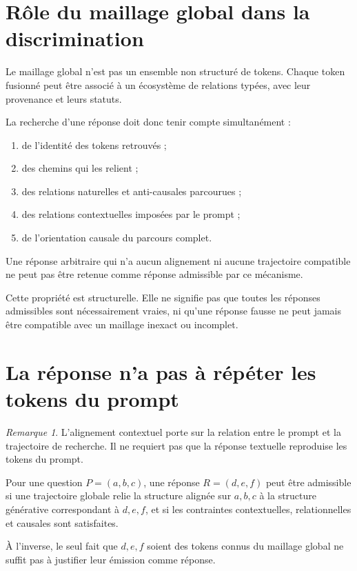 \documentclass[11pt,a4paper,oneside]{book}
\theoremstyle{remark}
\newtheorem{remarque}[definition]{Remarque}
\begin{document}
\section{Rôle du maillage global dans la discrimination}

Le maillage global n'est pas un ensemble non structuré de tokens.
Chaque token fusionné peut être associé à un écosystème de relations
typées, avec leur provenance et leurs statuts.

La recherche d'une réponse doit donc tenir compte simultanément :

\begin{enumerate}
  \item de l'identité des tokens retrouvés ;
  \item des chemins qui les relient ;
  \item des relations naturelles et anti-causales parcourues ;
  \item des relations contextuelles imposées par le prompt ;
  \item de l'orientation causale du parcours complet.
\end{enumerate}

Une réponse arbitraire qui n'a aucun alignement ni aucune trajectoire
compatible ne peut pas être retenue comme réponse admissible par
ce mécanisme.

Cette propriété est structurelle. Elle ne signifie pas que toutes
les réponses admissibles sont nécessairement vraies, ni qu'une
réponse fausse ne peut jamais être compatible avec un maillage
inexact ou incomplet.

\section{La réponse n'a pas à répéter les tokens du prompt}

\begin{remarque}
L'alignement contextuel porte sur la relation entre le prompt et la
trajectoire de recherche. Il ne requiert pas que la réponse textuelle
reproduise les tokens du prompt.

Pour une question \(P=(a,b,c)\), une réponse \(R=(d,e,f)\) peut être
admissible si une trajectoire globale relie la structure alignée sur
\(a,b,c\) à la structure générative correspondant à \(d,e,f\), et si
les contraintes contextuelles, relationnelles et causales sont
satisfaites.

À l'inverse, le seul fait que \(d,e,f\) soient des tokens connus du
maillage global ne suffit pas à justifier leur émission comme réponse.
\end{remarque}
\end{document}

